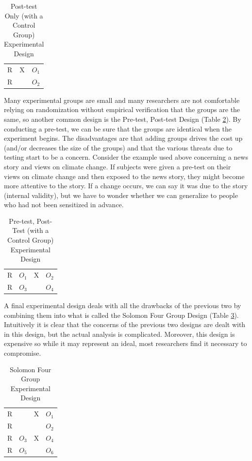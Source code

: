 \documentclass[11pt,openany]{book}\usepackage[]{graphicx}\usepackage[]{color}
\begin{document}
\begin{table}[h]
\caption{Post-test Only (with a Control Group) Experimental Design} 
\label{tab:Experiment1}
\begin{tabular}{lll}
R & X & $O_1$ \\
R &  & $O_2$
\end{tabular}
\end{table}
\FloatBarrier

Many experimental groups are small and many researchers are not comfortable relying on randomization without empirical verification that the groups are the same, so another common design is the Pre-test, Post-test Design (Table \ref{tab:Experiment2}). By conducting a pre-test, we can be sure that the groups are identical when the experiment begins. The disadvantages are that adding groups drives the cost up (and/or decreases the size of the groups) and that the various threats due to testing start to be a concern. Consider the example used above concerning a news story and views on climate change. If subjects were given a pre-test on their views on climate change and then exposed to the news story, they might become more attentive to the story. If a change occurs, we can say it was due to the story (internal validity), but we have to wonder whether we can generalize to people who had not been sensitized in advance.

\begin{table}[h]
\caption{Pre-test, Post-Test (with a Control Group) Experimental Design} 
\label{tab:Experiment2}

\begin{tabular}{llll}
R & $O_1$ & X & $O_2$ \\
R & $O_3$ &  & $O_4$
\end{tabular}
\end{table}
\FloatBarrier


A final experimental design deals with all the drawbacks of the previous two by combining them into what is called the Solomon Four Group Design (Table \ref{tab:Experiment3}). Intuitively it is clear that the concerns of the previous two designs are dealt with in this design, but the actual analysis is complicated. Moreover, this design is expensive so while it may represent an ideal, most researchers find it necessary to compromise.

\begin{table}[h]
\caption{Solomon Four Group Experimental Design} 
\label{tab:Experiment3}
\begin{tabular}{llll}
R &  & X & $O_1$ \\
R &  &  & $O_2$ \\
R & $O_3$ & X & $O_4$ \\
R & $O_5$ &  & $O_6$
\end{tabular}
\end{table}
\FloatBarrier
\end{document}
